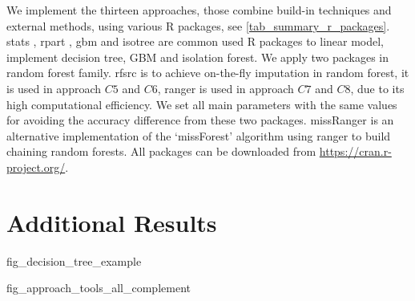 \documentclass[12pt,a4paper]{article}
\begin{document}
We implement the thirteen approaches, those combine build-in techniques and external methods, using various R packages, see \autoref{tab_summary_r_packages}. \textsf{stats} \citep{RCT2021}, \textsf{rpart} \citep{Therneau2019}, \textsf{gbm} \citep{Greenwell2020} and \textsf{isotree} \citep{Cortes2021} are common used \textsf{R} packages to linear model, implement decision tree, GBM and isolation forest. We apply two packages in random forest family. \textsf{rfsrc} \citep{Ishwaran2021} is to achieve on-the-fly imputation in random forest, it is used in approach $C5$ and $C6$, \textsf{ranger} \citep{Wright2017} is used in approach $C7$ and $C8$, due to its high computational efficiency. We set all main parameters with the same values for avoiding the accuracy difference from these two packages. \textsf{missRanger} \citep{Mayer2021} is an alternative implementation of the `missForest' algorithm using \textsf{ranger} to build chaining random forests. All packages can be downloaded from \href{https://cran.r-project.org/web/packages/available_packages_by_name.html}{https://cran.r-project.org/}.

%
\begin{quote}
\end{quote}
%

\section{Additional Results}


\newpage


\clearpage


\setcounter{table}{0}
\renewcommand{\thetable}{A\arabic{table}}
\clearpage


\clearpage


\setcounter{table}{0}
\renewcommand{\thetable}{B\arabic{table}}
\clearpage
\begin{landscape}

\end{landscape}

\clearpage


\setcounter{table}{0}
\renewcommand{\thetable}{C\arabic{table}}
\clearpage



\setcounter{figure}{0}
\renewcommand{\thefigure}{B\arabic{figure}}
\clearpage
{fig_decision_tree_example}

\clearpage
{fig_approach_tools_all_complement}
\end{document}
